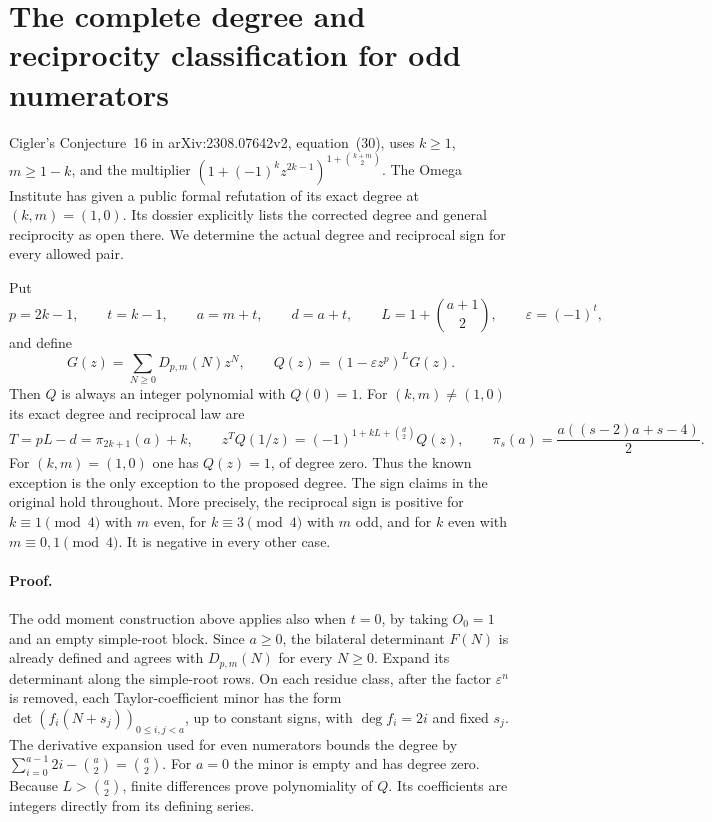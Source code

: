 \documentclass[11pt,a4paper]{article}
\theoremstyle{definition}\newtheorem{problem}[theorem]{Auxiliary problem}
\theoremstyle{remark}\newtheorem*{remark}{Remark}
\begin{document}
\section{The complete degree and reciprocity classification for odd numerators}
Cigler's Conjecture~16 in arXiv:2308.07642v2, equation~(30), uses
$k\ge1$, $m\ge1-k$, and the multiplier
$(1+(-1)^k z^{2k-1})^{1+\binom{k+m}{2}}$.
The Omega Institute \cite{Omega} has given a public formal refutation of its exact
degree at $(k,m)=(1,0)$. Its dossier explicitly lists the corrected
degree and general reciprocity as open there. We determine the actual
degree and reciprocal sign for every allowed pair.

Put
\[
 p=2k-1,\qquad t=k-1,\qquad a=m+t,\qquad
 d=a+t,\qquad L=1+\binom{a+1}{2},\qquad \varepsilon=(-1)^t,
\]
and define
\[
 G(z)=\sum_{N\ge0}D_{p,m}(N)z^N,\qquad
 Q(z)=(1-\varepsilon z^p)^L G(z).
\]
Then $Q$ is always an integer polynomial with $Q(0)=1$.
For $(k,m)\ne(1,0)$ its exact degree and reciprocal law are
\[
 T=pL-d=\pi_{2k+1}(a)+k,\qquad
 z^TQ(1/z)=(-1)^{1+kL+\binom d2}Q(z),
 \qquad \pi_s(a)=\frac{a((s-2)a+s-4)}2.
\]
For $(k,m)=(1,0)$ one has $Q(z)=1$, of degree zero. Thus the known
exception is the only exception to the proposed degree. The sign claims
in the original hold throughout. More precisely, the reciprocal sign
is positive for $k\equiv1\pmod4$ with $m$ even, for
$k\equiv3\pmod4$ with $m$ odd, and for $k$ even with
$m\equiv0,1\pmod4$. It is negative in every other case.

\paragraph{Proof.}
The odd moment construction above applies also when $t=0$, by taking
$O_0=1$ and an empty simple-root block. Since $a\ge0$, the bilateral
determinant $F(N)$ is already defined and agrees with $D_{p,m}(N)$
for every $N\ge0$. Expand its determinant along the simple-root rows.
On each residue class, after the factor $\varepsilon^n$ is removed,
each Taylor-coefficient minor has the form
$\det(f_i(N+s_j))_{0\le i,j<a}$, up to constant signs, with
$\deg f_i=2i$ and fixed $s_j$.
The derivative expansion used for even numerators bounds the degree by
$\sum_{i=0}^{a-1}2i-\binom a2=\binom a2$.
For $a=0$ the minor is empty and has degree zero.
Because $L>\binom a2$, finite differences prove polynomiality of $Q$.
Its coefficients are integers directly from its defining series.
\end{document}
